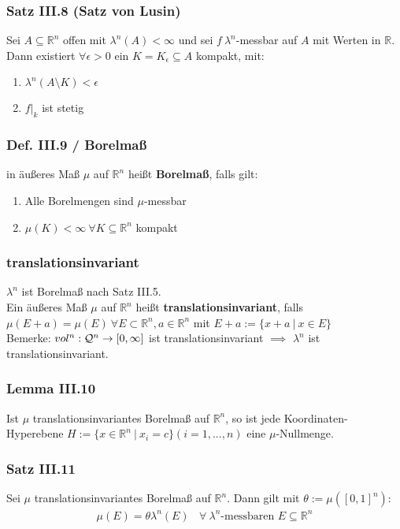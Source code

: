 \begin{frame}
\frametitle{Satz III.8 (Satz von Lusin)}
Sei $A \subseteq \mathbb{R}^n$ offen mit $\lambda^n(A) < \infty$ und sei $f \ \lambda^n$-messbar auf $A$ mit Werten in $\mathbb{R}$. Dann existiert $\forall \epsilon > 0$ ein $K = K_{\epsilon} \subseteq A$ kompakt, mit:
    \begin{enumerate}[label=\roman*)]
      \item $\lambda^n(A \setminus K) < \epsilon$
      \item $f|_k$ ist stetig
    \end{enumerate}
\end{frame}

\begin{frame}
\frametitle{Def. III.9 / Borelmaß}
in äußeres Maß $\mu$ auf $\mathbb{R}^n$ heißt \textbf{Borelmaß}, falls gilt:
    \begin{enumerate}[label=\roman*)]
      \item Alle Borelmengen sind $\mu$-messbar
      \item $\mu(K)<\infty \ \forall K \subseteq \mathbb{R}^n$ kompakt
    \end{enumerate}
\end{frame}


\begin{frame}
\frametitle{translationsinvariant}
$\lambda^n$ ist Borelmaß nach Satz III.5.\\
    Ein äußeres Maß $\mu$ auf $\mathbb{R}^n$ heißt \textbf{translationsinvariant}, falls \\
    $\mu(E + a) = \mu(E) \ \forall E \subset \mathbb{R}^n, a \in \mathbb{R}^n$ mit $E + a := \{x + a \ | \ x \in E\}$\\
    Bemerke: $vol^n:\mathcal{Q}^n \to [0, \infty]$ ist translationsinvariant $\implies$ $\lambda^n$ ist translationsinvariant.
\end{frame}


\begin{frame}
\frametitle{Lemma III.10}
Ist $\mu$ translationsinvariantes Borelmaß auf $\mathbb{R}^n$, so ist jede Koordinaten-Hyperebene $H := \{x \in \mathbb{R}^n \ | \ x_i = c\} (i=1,...,n)$ eine $\mu$-Nullmenge.
\end{frame}


\begin{frame}
\frametitle{Satz III.11}
Sei $\mu$ translationsinvariantes Borelmaß auf $\mathbb{R}^n$. Dann gilt mit $\theta := \mu([0,1]^n)$:
    \begin{align*}
      \mu(E) = \theta \lambda^n(E) \ \ \ \ \forall \ \lambda^n \text{-messbaren } E \subseteq \mathbb{R}^n
    \end{align*}
\end{frame}

